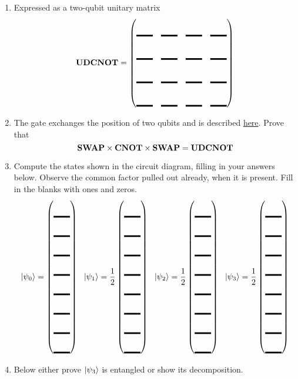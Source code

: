 \documentclass[12pt]{article}
\begin{document}
\begin{enumerate}
\begin{enumerate}[label=\theenumi.\arabic*]
\item{} Expressed as a two-qubit unitary matrix
\[
\NamedGate{UDCNOT} = \begin{pmatrix*}[r]
\Blank[2em]{} & \Blank[2em]{} & \Blank[2em]{} & \Blank[2em]{}\\[0.5em]
\Blank[2em]{} & \Blank[2em]{} & \Blank[2em]{} & \Blank[2em]{}\\[0.5em]
\Blank[2em]{} & \Blank[2em]{} & \Blank[2em]{} & \Blank[2em]{}\\[0.5em]
\Blank[2em]{} & \Blank[2em]{} & \Blank[2em]{} & \Blank[2em]{}
\end{pmatrix*}
\]
\item{} The  gate exchanges the position of two qubits and is described \href{https://docs.quantum.ibm.com/api/qiskit/qiskit.circuit.library.SwapGate}{here}. Prove that 
\[
\mbox{\bfseries{\textrm{SWAP}}} \times \mbox{\bfseries{\textrm{CNOT}}} \times \mbox{\bfseries{\textrm{SWAP}}} = \mbox{\bfseries{\textrm{UDCNOT}}}
\]
\LeaveSpace{}
\item{} Compute the states shown in the circuit diagram, filling in your answers below. Observe the common factor pulled out already, when it is present.  Fill in the blanks with ones and zeros.
\def\FS#1#2{%
\QState{#1} = #2\begin{pmatrix*}[r]
\Blank[2em]{} \\
\Blank[2em]{} \\
\Blank[2em]{} \\
\Blank[2em]{} \\
\Blank[2em]{} \\
\Blank[2em]{} \\
\Blank[2em]{} \\
\Blank[2em]{}
\end{pmatrix*}%
}
\[ \FS{0}{\relax}\ \ 
\FS{1}{\frac{1}{2}}\ \ 
\FS{2}{\frac{1}{2}}\ \ 
\FS{3}{\frac{1}{2}} \]

\item{} Below either prove $\ket{\psi_{3}}$ is entangled or show its decomposition.
\LeaveSpace{|}
\end{enumerate}


\end{enumerate}
\end{document}
